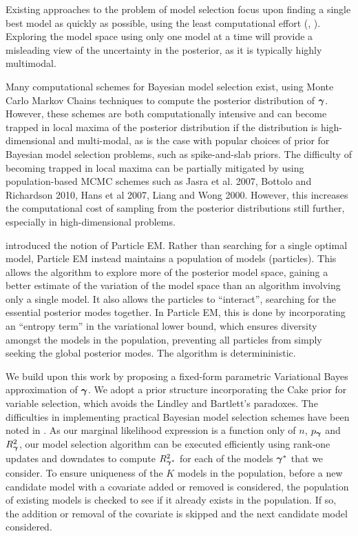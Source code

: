 
Existing approaches to the problem of model selection focus upon finding a single best model as quickly as
possible, using the least computational effort (\cite{You2014}, \cite{Rockova2014}). Exploring the model space
using only one model at a time will provide a misleading view of the uncertainty in the posterior, as it is
typically highly multimodal.

Many computational schemes for Bayesian model selection exist, using Monte Carlo Markov Chains techniques to
compute the posterior distribution of ${\boldsymbol \gamma}$. However, these schemes are both computationally intensive and
can become trapped in local maxima of the posterior distribution if the distribution is high-dimensional and
multi-modal, as is the case with popular choices of prior for Bayesian model selection problems, such as
spike-and-slab priors. The difficulty of becoming trapped in local maxima can be partially mitigated by using
population-based MCMC schemes such as Jasra et al. 2007, Bottolo and Richardson 2010, Hans et al 2007, Liang
and Wong 2000. However, this increases the computational cost of sampling from the posterior distributions
still further, especially in high-dimensional problems.

\cite{Rockova2017} introduced the notion of Particle EM. Rather than searching for a single optimal model,
Particle EM instead maintains a population of models (particles). This allows the algorithm to explore more of
the posterior model space, gaining a better estimate of the variation of the model space than an algorithm
involving only a single model. It also allows the particles to ``interact'', searching for the essential
posterior modes together. In Particle EM, this is done by incorporating an ``entropy term'' in the variational
lower bound, which ensures diversity amongst the models in the population, preventing all particles from
simply seeking the global posterior modes. The algorithm is determininistic.

We build upon this work by proposing a fixed-form parametric Variational Bayes approximation of ${\boldsymbol \gamma}$. We
adopt a prior structure incorporating the Cake prior for variable selection, which avoids the Lindley and
Bartlett's paradoxes. The difficulties in implementing practical Bayesian model selection schemes have been
noted in \cite{Chipman2014}. As our marginal likelihood expression is a function only of $n$, $p_{\boldsymbol \gamma}$ and
$R^2_{\boldsymbol \gamma}$, our model selection algorithm can be executed efficiently using rank-one updates and downdates
to compute $R^2_{{\boldsymbol \gamma}^*}$ for each of the models ${\boldsymbol \gamma}^*$ that we consider. To ensure uniqueness of the
$K$ models in the population, before a new candidate model with a covariate added or removed is considered,
the population of existing models is checked to see if it already exists in the population. If so, the
addition or removal of the covariate is skipped and the next candidate model considered.

